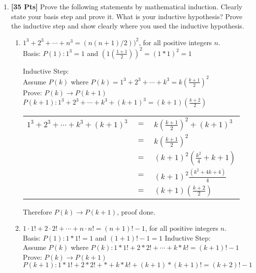 \begin{enumerate}

\item {\bf [35 Pts]} Prove the following statements by mathematical induction. Clearly state your basis step and prove it. What is your inductive hypothesis? Prove the inductive step and show clearly where you used the inductive hypothesis.

\begin{enumerate}

\item $1^3 + 2^3 + \cdots + n^3 = (n(n+1)/2))^2$, for all positive integers $n$.\\

Basis: $P(1): 1^3 =  1$ and $(1(\frac{1+1}{2}))^2 = (1 * 1)^2 = 1$

Inductive Step:\\
Assume $P(k)$ where $P(k) = 1^3 + 2^3 + \cdots + k^3 = k(\frac{k+1}{2})^2$\\
Prove: $P(k) \rightarrow P(k+1)$\\
$P(k+1): 1^3 + 2^3 + \cdots + k^3 + (k+1)^3 = (k+1)(\frac{k+2}{2})$\\

\begin{table}[h]
\centering
\begin{tabular}{rcl}
$1^3 + 2^3 + \cdots + k^3 + (k+1)^3$ & $=$ & $k(\frac{k+1}{2})^2 + (k+1)^3$ \\
                                     & $=$ & $k(\frac{k+1}{2})^2$           \\
                                     & $=$ & $(k+1)^2 (\frac{k^2}{4} +k +1)$  \\
                                     & $=$ & $(k+1)^2 \frac{(k^2 +4k +4)}{4}$ \\
                                     & $=$ & $(k+1)(\frac{k+2}{2})$          
\end{tabular}
\end{table}

Therefore $P(k) \rightarrow P(k+1)$, proof done.\\

\item $1 \cdot 1! + 2 \cdot 2! + \cdots + n \cdot n! = (n+1)! - 1$, for all positive integers $n$.\\

Basis: $P(1):  1*1! = 1$ and $(1+1)! -1 = 1$
Inductive Step:\\
Assume $P(k)$ where $P(k): 1 * 1! + 2 * 2! + \cdots + k * k! = (k+1)! - 1$\\
Prove: $P(k) \rightarrow P(k+1)$\\
$P(k+1): 1 * 1! + 2 * 2! + * + k * k! + (k+1) * (k+1)! = (k+2)! - 1$\\


\end{enumerate}
\end{enumerate}
